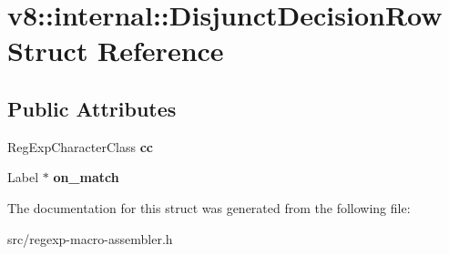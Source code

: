 \hypertarget{structv8_1_1internal_1_1_disjunct_decision_row}{}\section{v8\+:\+:internal\+:\+:Disjunct\+Decision\+Row Struct Reference}
\label{structv8_1_1internal_1_1_disjunct_decision_row}
\subsection*{Public Attributes}
\begin{DoxyCompactItemize}
\item 
\hypertarget{structv8_1_1internal_1_1_disjunct_decision_row_a00ccd419406cacc950f0bebaec37b155}{}Reg\+Exp\+Character\+Class {\bfseries cc}\label{structv8_1_1internal_1_1_disjunct_decision_row_a00ccd419406cacc950f0bebaec37b155}

\item 
\hypertarget{structv8_1_1internal_1_1_disjunct_decision_row_ace085ac637c04fa532662369dcede45e}{}Label $\ast$ {\bfseries on\+\_\+match}\label{structv8_1_1internal_1_1_disjunct_decision_row_ace085ac637c04fa532662369dcede45e}

\end{DoxyCompactItemize}


The documentation for this struct was generated from the following file\+:\begin{DoxyCompactItemize}
\item 
src/regexp-\/macro-\/assembler.\+h\end{DoxyCompactItemize}
